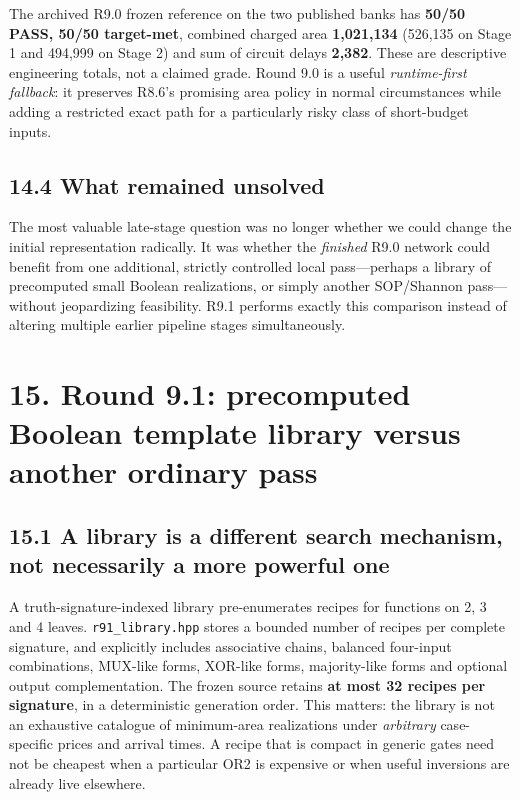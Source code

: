 The archived R9.0 frozen reference on the two published banks has \textbf{50/50 PASS, 50/50 target-met}, combined charged area \textbf{1,021,134} (526,135 on Stage 1 and 494,999 on Stage 2) and sum of circuit delays \textbf{2,382}. These are descriptive engineering totals, not a claimed grade. Round 9.0 is a useful \emph{runtime-first fallback}: it preserves R8.6's promising area policy in normal circumstances while adding a restricted exact path for a particularly risky class of short-budget inputs.

\subsection{14.4 What remained unsolved}\label{what-remained-unsolved}

The most valuable late-stage question was no longer whether we could change the initial representation radically. It was whether the \emph{finished} R9.0 network could benefit from one additional, strictly controlled local pass---perhaps a library of precomputed small Boolean realizations, or simply another SOP/Shannon pass---without jeopardizing feasibility. R9.1 performs exactly this comparison instead of altering multiple earlier pipeline stages simultaneously.

\section{15. Round 9.1: precomputed Boolean template library versus another ordinary pass}\label{round-9.1-precomputed-boolean-template-library-versus-another-ordinary-pass}

\subsection{15.1 A library is a different search mechanism, not necessarily a more powerful one}\label{a-library-is-a-different-search-mechanism-not-necessarily-a-more-powerful-one}

A truth-signature-indexed library pre-enumerates recipes for functions on 2, 3 and 4 leaves. \texttt{r91\_library.hpp} stores a bounded number of recipes per complete signature, and explicitly includes associative chains, balanced four-input combinations, MUX-like forms, XOR-like forms, majority-like forms and optional output complementation. The frozen source retains \textbf{at most 32 recipes per signature}, in a deterministic generation order. This matters: the library is not an exhaustive catalogue of minimum-area realizations under \emph{arbitrary} case-specific prices and arrival times. A recipe that is compact in generic gates need not be cheapest when a particular OR2 is expensive or when useful inversions are already live elsewhere.

